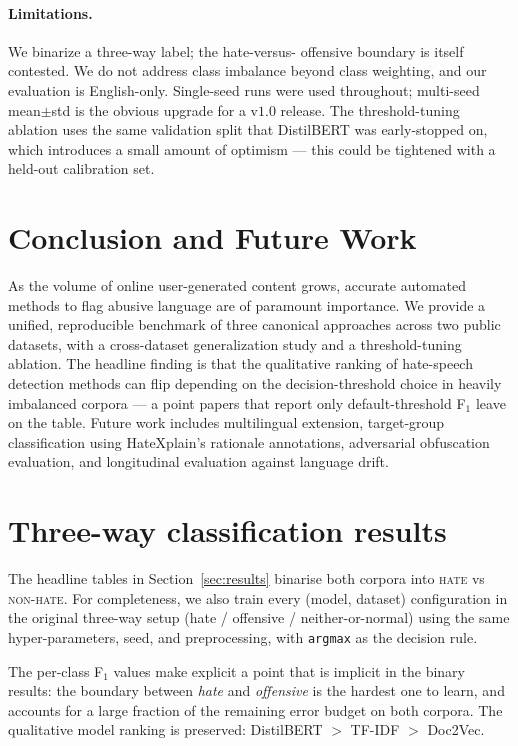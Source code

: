 \documentclass[11pt]{article}
\begin{document}
\paragraph{Limitations.} We binarize a three-way label; the hate-versus-
offensive boundary is itself contested. We do not address class imbalance
beyond class weighting, and our evaluation is English-only. Single-seed
runs were used throughout; multi-seed mean$\pm$std is the obvious upgrade
for a v$1.0$ release. The threshold-tuning ablation uses the same
validation split that DistilBERT was early-stopped on, which introduces a
small amount of optimism --- this could be tightened with a held-out
calibration set.

\section{Conclusion and Future Work}

As the volume of online user-generated content grows, accurate automated
methods to flag abusive language are of paramount importance. We provide a
unified, reproducible benchmark of three canonical approaches across two
public datasets, with a cross-dataset generalization study and a
threshold-tuning ablation. The headline finding is that the qualitative
ranking of hate-speech detection methods can flip depending on the
decision-threshold choice in heavily imbalanced corpora --- a point papers
that report only default-threshold F$_1$ leave on the table. Future work
includes multilingual extension, target-group classification using
HateXplain's rationale annotations, adversarial obfuscation evaluation,
and longitudinal evaluation against language drift.

\appendix

\section{Three-way classification results}
\label{app:3way}

The headline tables in Section~\ref{sec:results} binarise both corpora into
\textsc{hate} vs \textsc{non-hate}. For completeness, we also train every
(model, dataset) configuration in the original three-way setup
(hate / offensive / neither-or-normal) using the same hyper-parameters, seed,
and preprocessing, with \texttt{argmax} as the decision rule.



The per-class F$_1$ values make explicit a point that is implicit in the
binary results: the boundary between \emph{hate} and \emph{offensive} is
the hardest one to learn, and accounts for a large fraction of the
remaining error budget on both corpora. The qualitative model ranking is
preserved: DistilBERT $>$ TF-IDF $>$ Doc2Vec.
\end{document}
